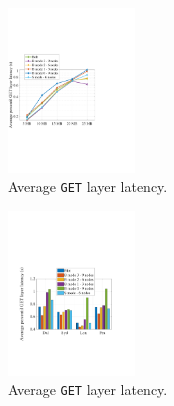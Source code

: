 %


\begin{figure}[t]
	\centering
	\includegraphics[width=0.3\textwidth]{graphs/dalprimaryperformance.pdf}
	\caption{Average \texttt{GET} layer latency.}
	\label{fig:eval-dalprimary}
	
\end{figure}

\begin{figure}[t]
	\centering
	\includegraphics[width=0.3\textwidth]{graphs/total-traces.pdf}
	\caption{Average \texttt{GET} layer latency. }
	\label{fig:eval-total-traces}
	
\end{figure}